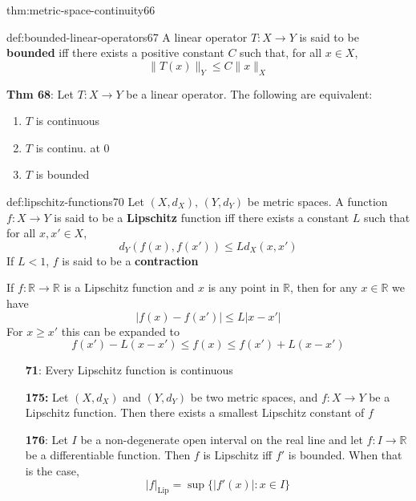 \documentclass[landscape, 8pt]{extarticle}
\begin{document}
\begin{multicols}{3}
\begin{thm}{thm:metric-space-continuity}{66}
     
\end{thm}

\begin{dfn}{def:bounded-linear-operators}{67}
    A linear operator $T : X \to Y$ is said to be \textbf{bounded} iff there exists a positive constant $C$ such that, for all $x\in X$,
    \[\lVert T(x) \rVert_{Y} \le C \lVert x \rVert_{X}\]

    \longrule{0.08ex}
    \textbf{Thm 68}: Let $T: X \to Y $ be a linear operator. The following are equivalent:
    \vspace{-13pt}
    \begin{multicols}{3}
    \begin{enumerate}[leftmargin=*]
        \item $T$ is continuous
        \item $T$ is continu. at $0$
        \item $T$ is bounded
    \end{enumerate}
    \end{multicols}
\end{dfn}

\begin{dfn}{def:lipschitz-functions}{70}
    Let $(X, d_{X}),\,(Y, d_{Y})$ be metric spaces. A function $f : X \to Y$ is said to be a \textbf{Lipschitz} function iff there exists a constant $L$ such that for all $x,x'\in X$,
    \[d_{Y}(f(x), f(x')) \le L d_{X}(x,x')\]
    If $L < 1$, $f$ is said to be a \textbf{contraction}

    If $f : \mathbb{R} \to \mathbb{R}$ is a Lipschitz function and $x$ is any point in $\mathbb{R}$, then for any $x\in \mathbb{R}$ we have
    \[\lvert f(x) - f(x') \rvert \le L\lvert x - x' \rvert\]
    For $x \ge x'$ this can be expanded to
    \[f(x') - L(x - x') \le f(x) \le f(x') + L(x - x')\]


    \vspace{-8pt}
    \begin{itemize}
        \item[\textbf{71}:] Every Lipschitz function is continuous
        \item[\textbf{175:}] Let $(X, d_{X})$ and $(Y, d_{Y})$ be two metric spaces, and $f : X \to Y$ be a Lipschitz function. Then there exists a smallest Lipschitz constant of $f$ 
        \item[\textbf{176}:] Let $I$ be a non-degenerate open interval on the real line and let $f : I \to \mathbb{R}$ be a differentiable function. Then $f$ is Lipschitz iff $f'$ is bounded. When that is the case,
            \[\lvert f \rvert_{\text{Lip}} = \sup \{\lvert f'(x) \rvert : x\in I\}\]
    \end{itemize}


\end{dfn}
\end{multicols}
\end{document}
